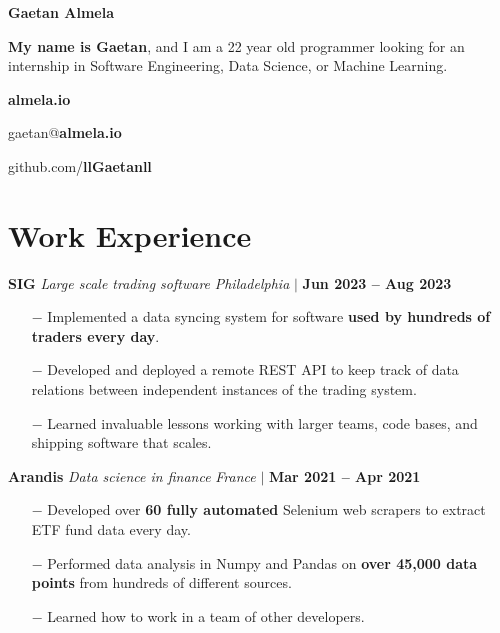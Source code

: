 \documentclass[12pt]{article}
\newcommand{\bigtitle}[5]{
  {\bf \large #1} \textemdash{} {\large \it #2} \hfill {#3}

  {\small #4}

  \smallskip

  {#5} %

  \medskip
}
\begin{document}
    {\fontsize{40}{50} \selectfont \bf \intertabular Gaetan Almela}

    \smallskip

    {\bf My name is Gaetan}, and I am a 22 year old programmer looking for an
    internship in Software Engineering, Data Science, or Machine Learning.

    \begin{center}
      \begin{multicols}{3}
       {\bf almela.io}

       gaetan@{\bf almela.io}

       github.com/{\bf llGaetanll}
      \end{multicols}
    \end{center}

    \section{Work Experience}

    \smallskip

    \bigtitle{SIG}{Large scale trading software}
    {
      \textit{Philadelphia} $\big|$ \textbf{Jun 2023 -- Aug 2023}
    }
    {}
    {
      \begin{itemize}
        \item[$-$] Implemented a data syncing system for software {\bf used by
          hundreds of traders every day}.
        \item[$-$] Developed and deployed a remote REST API to keep track of data
          relations between independent instances of the trading system.
        \item[$-$] Learned invaluable lessons working with larger teams,
          code bases, and shipping software that scales.
      \end{itemize}
    }

    \bigtitle{Arandis}{Data science in finance}
    {
      \textit{France} $\big|$ \textbf{Mar 2021 -- Apr 2021}
    }
    {}
    {
      \begin{itemize}
        \item[$-$] Developed over {\bf 60 fully automated} Selenium web scrapers to extract
              ETF fund data every day.
        \item[$-$] Performed data analysis in Numpy and Pandas on {\bf over
              45,000 data points} from hundreds of different sources.
        \item[$-$] Learned how to work in a team of other developers.
      \end{itemize}
    }
\end{document}
